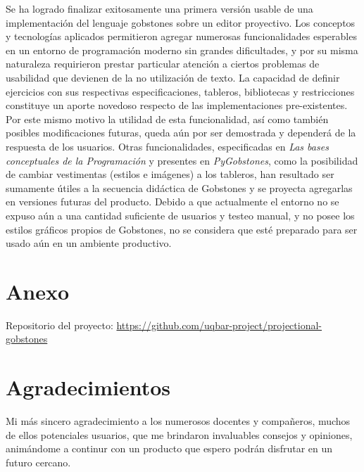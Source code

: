 Se ha logrado finalizar exitosamente una primera versión usable de una implementación del lenguaje gobstones sobre un editor proyectivo. Los conceptos y tecnologías aplicados permitieron agregar numerosas funcionalidades esperables en un entorno de programación moderno sin grandes dificultades, y por su misma naturaleza requirieron prestar particular atención a ciertos problemas de usabilidad que devienen de la no utilización de texto.
La capacidad de definir ejercicios con sus respectivas especificaciones, tableros, bibliotecas y restricciones constituye un aporte novedoso respecto de las implementaciones pre-existentes. Por este mismo motivo la utilidad de esta funcionalidad, así como también posibles modificaciones futuras, queda aún por ser demostrada y dependerá de la respuesta de los usuarios. Otras funcionalidades, especificadas en \textit{Las bases conceptuales de la Programación} \cite{Gobstones} y presentes en \textit{PyGobstones}, como la posibilidad de cambiar vestimentas (estilos e imágenes) a los tableros, han resultado ser sumamente útiles a la secuencia didáctica de Gobstones y se proyecta agregarlas en versiones futuras del producto.
Debido a que actualmente el entorno no se expuso aún a una cantidad suficiente de usuarios y testeo manual, y no posee los estilos gráficos propios de Gobstones, no se considera que esté preparado para ser usado aún en un ambiente productivo. 

\section{Anexo}\label{anexo}

Repositorio del proyecto: \url{https://github.com/uqbar-project/projectional-gobstones}

\section{Agradecimientos}

Mi más sincero agradecimiento a los numerosos docentes y compañeros, muchos de ellos potenciales usuarios, que me brindaron invaluables consejos y opiniones, animándome a continur con un producto que espero podrán disfrutar en un futuro cercano.
